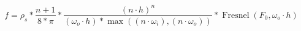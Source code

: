 \begin{equation}
    f = \rho_{s}* \frac{n+1}{8*\pi} *
        \frac{({n}\cdot{h})^n}
        
             {({\omega_{o}}\cdot{h})*
             
                \max(({n}\cdot{\omega_{i}}) , ({n}\cdot{\omega_{o}}))}*
                
       	\operatorname{Fresnel}(F_{0},{\omega_{o}}\cdot{h})
\end{equation}
